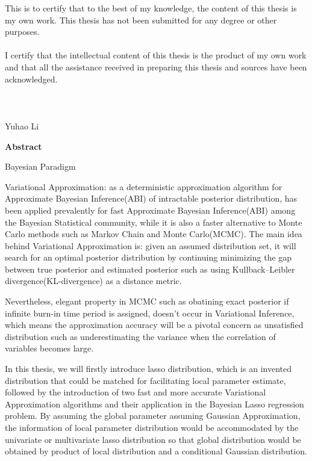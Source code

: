 \noindent This is to certify that to the best of my knowledge, the content of this thesis is my own work. This thesis has not been submitted for any degree or other purposes.\\
\\
\noindent I certify that the intellectual content of this thesis is the product of my own work and that all the assistance received in preparing this thesis and sources have been acknowledged.\\
\\
\\
\\
Yuhao Li

\pagebreak
\hspace{0pt}

\begin{center}
    \textbf{\large Abstract }\\
    \vspace{0.5cm}
\end{center}
Bayesian Paradigm

Variational Approximation: as a deterministic approximation algorithm for Approximate Bayesian Inference(ABI) of intractable posterior distribution, has been applied prevalently for fast Approximate Bayesian Inference(ABI) among the Bayesian Statistical community, while it is also a faster alternative to Monte Carlo methods such as Markov Chain and Monte Carlo(MCMC).
The main idea behind Variational Approximation is: given an assumed distribution set, it will search for an optimal posterior distribution by continuing minimizing the gap between true posterior and estimated posterior such as using Kullback–Leibler divergence(KL-divergence) as a distance metric.

Nevertheless, elegant property in MCMC such as obatining exact posterior if infinite burn-in time period is assigned, doesn't occur in Variational Inference, which means the approximation accuracy will be a pivotal concern as  unsatisfied distribution such as underestimating the variance when the correlation of variables becomes large. 

In this thesis, we will firstly introduce lasso distribution, which is an invented distribution that could be matched for facilitating local parameter estimate, followed by the introduction of two fast and more accurate Variational Approximation algorithms and their application in the Bayesian Lasso regression problem. By assuming the global parameter assuming Gaussian Approximation, the information of local parameter distribution would be accommodated by the univariate or multivariate lasso distribution so that 
global distribution would be obtained by product of local distribution and a conditional Gaussian distribution.


